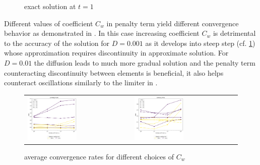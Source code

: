 \begin{example}
\begin{figure}[h]
	\caption{ exact solution at $t = 1$}
	\label{fig:burgess_hesthaven_ext}
\end{figure}
Different values of coefficient $C_w$ in penalty term yield different convergence 
behavior as demonstrated in . In this case increasing 
coefficient $C_w$ is detrimental to the accuracy of the solution for $D=0.001$ as it 
develops into steep step (cf. \cref{fig:burgess_hesthaven_ext}) whose approximation 
requires discontinuity in approximate solution. For $D=0.01$ the diffusion leads to much 
more gradual solution and the penalty term counteracting discontinuity between elements 
is beneficial, it also helps counteract oscillations similarly to the limiter in 
. 
\end{example}


\begin{figure}[h!]
	\centering
	\begin{tabular}{p{} p{}}
		\vspace{0pt} 
		\includegraphics[width=0.49\textwidth]{../figs/parametric/burgers_1D/orders_unlimited}
		&
		\vspace{0pt} 
		\includegraphics[width=0.49\textwidth]{../figs/parametric/burgers_1D/orders_limited}
	\end{tabular}
	\caption{ average convergence rates for different choices of 
	$C_w$}
	\label{fig:burgess_orders}
\end{figure}


